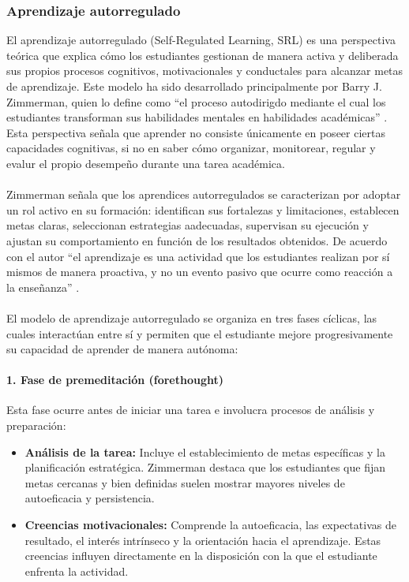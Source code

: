 \subsubsection{Aprendizaje autorregulado}
El aprendizaje autorregulado (Self-Regulated Learning, SRL) es una perspectiva teórica que explica cómo los estudiantes gestionan de manera activa y deliberada sus propios procesos cognitivos, motivacionales y conductales para alcanzar metas de aprendizaje. Este modelo ha sido desarrollado principalmente por Barry J. Zimmerman, quien lo define como “el proceso autodirigdo mediante el cual los estudiantes transforman sus habilidades mentales en habilidades académicas” \cite{Zimmerman2002}. Esta perspectiva señala que aprender no consiste únicamente en poseer ciertas capacidades cognitivas, si no en saber cómo organizar, monitorear, regular y evalur el propio desempeño durante una tarea académica.
\\
\\
Zimmerman señala que los aprendices autorregulados se caracterizan por adoptar un rol activo en su formación: identifican sus fortalezas y limitaciones, establecen metas claras, seleccionan estrategias aadecuadas, supervisan su ejecución y ajustan su comportamiento en función de los resultados obtenidos. De acuerdo con el autor “el aprendizaje es una actividad que los estudiantes realizan por sí mismos de manera proactiva, y no un evento pasivo que ocurre como reacción a la enseñanza” \cite{Zimmerman2002}.
\\
\\
El modelo de aprendizaje autorregulado se organiza en tres fases cíclicas, las cuales interactúan entre sí y permiten que el estudiante mejore progresivamente su capacidad de aprender de manera autónoma:

\paragraph{1. Fase de premeditación (forethought)}

Esta fase ocurre antes de iniciar una tarea e involucra procesos de análisis y preparación:

\begin{itemize}
    \item \textbf{Análisis de la tarea:} Incluye el establecimiento de metas específicas y la planificación estratégica. Zimmerman destaca que los estudiantes que fijan metas cercanas y bien definidas suelen mostrar mayores niveles de autoeficacia y persistencia.
    
    \item \textbf{Creencias motivacionales:} Comprende la autoeficacia, las expectativas de resultado, el interés intrínseco y la orientación hacia el aprendizaje. Estas creencias influyen directamente en la disposición con la que el estudiante enfrenta la actividad.
\end{itemize}

